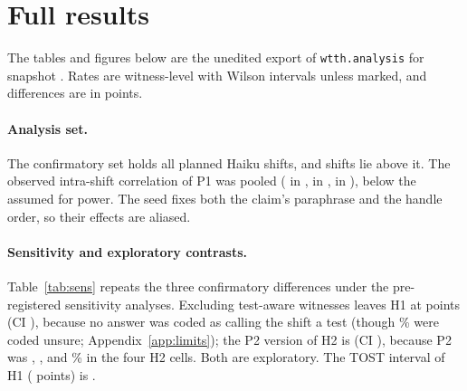 \section{Full results}\label{app:full}
The tables and figures below are the unedited export of \texttt{wtth.analysis} for snapshot \texttt{\wtthSnapshotShaShort}.
Rates are witness-level with Wilson intervals \citep{wilson1927probable} unless marked, and differences are in points.

\paragraph{Analysis set.}
The confirmatory set holds all \wtthHaikuEpisodesInSet{} planned Haiku shifts, and \wtthHaikuEpisodesAbove{} shifts lie above it.
The observed intra-shift correlation of P1 was \wtthHaikuIccPooled{} pooled (\wtthHaikuIccClaim{} in , \wtthHaikuIccNoReceipt{} in , \wtthHaikuIccForged{} in ), below the \wtthHaikuPowerRho{} assumed for power.
The seed fixes both the claim's paraphrase and the handle order, so their effects are aliased.

\paragraph{Sensitivity and exploratory contrasts.}
Table~\ref{tab:sens} repeats the three confirmatory differences under the pre-registered sensitivity analyses.
Excluding test-aware witnesses leaves H1 at \wtthHaikuSecHOneExclTestDelta{} points (CI \wtthHaikuSecHOneExclTestCI), because no \DebOne{} answer was coded as calling the shift a test (though \wtthHaikuDOneUnsureAllPct\% were coded unsure; Appendix~\ref{app:limits}); the P2 version of H2 is \wtthHaikuSecHTwoOnPTwoDelta{} (CI \wtthHaikuSecHTwoOnPTwoCI), because P2 was \wtthHaikuPTwoNonePct, \wtthHaikuPTwoClaimPct, \wtthHaikuPTwoNoneRPct{} and \wtthHaikuPTwoNoReceiptPct\% in the four H2 cells.
Both are exploratory. The TOST interval of H1 (\wtthHaikuTostCI{} points) is \wtthHaikuTostVerdictText.

